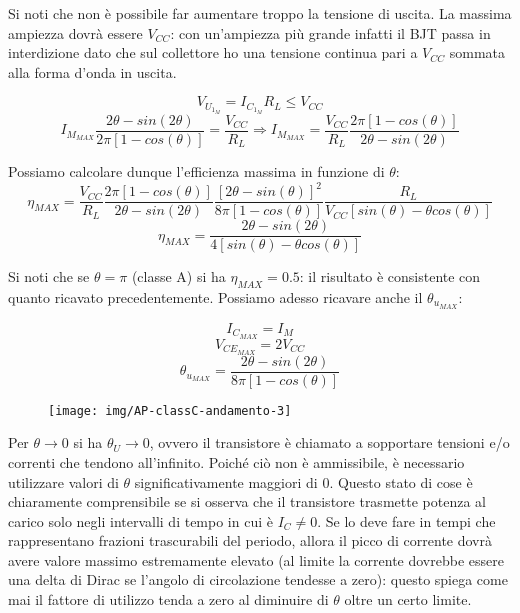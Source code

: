 Si noti che non è possibile far aumentare troppo la tensione di uscita. La massima ampiezza dovrà essere $V_{CC}$: con un'ampiezza più grande infatti il BJT passa in interdizione dato che sul collettore ho una tensione continua pari a $V_{CC}$ sommata alla forma d'onda in uscita.

\[ V_{U_{1_M}} =  I_{C_{1_M}} R_L \le V_{CC}\]
\[I_{M_{MAX}} \frac{2\theta-sin(2\theta)}{2\pi \left[1-cos(\theta)\right]} = \frac{V_{CC}}{R_L} \Rightarrow 
I_{M_{MAX}} = \frac{V_{CC}}{R_L} \frac{2\pi \left[1-cos(\theta)\right]}{2\theta-sin(2\theta)}
\]

Possiamo calcolare dunque l'efficienza massima in funzione di $\theta$:
\[\eta_{MAX} =  \frac{V_{CC}}{R_L} \frac{2\pi \left[1-cos(\theta)\right]}{2\theta-sin(2\theta)} \frac{\left[2\theta - sin(\theta)\right]^2}{8\pi \left[1-cos(\theta)\right]} \frac{R_L}{V_{CC}\left[sin(\theta)-\theta cos(\theta)\right]}\]
\[\eta_{MAX} = \frac{2\theta - sin(2\theta)}{4\left[ sin(\theta) - \theta cos(\theta)\right]}\]

Si noti che se $\theta = \pi$ (classe A) si ha $\eta_{MAX} = 0.5$: il risultato è consistente con quanto ricavato precedentemente. Possiamo adesso ricavare anche il $\theta_{u_{MAX}}$:

\[I_{C_{MAX}} = I_M\]
\[V_{CE_{MAX}} = 2V_{CC} \]
\[\theta_{u_{MAX}} = \frac{2\theta - sin(2\theta)}{8\pi\left[  1-cos(\theta)\right]}\]





\begin{figure}[tbh]
\centering
\texttt{[image: img/AP-classC-andamento-3]}
\caption{}
\label{fig:ap-classc-andamento-3}
\end{figure}


Per $\theta \rightarrow 0$ si ha $\theta_U \rightarrow 0$, ovvero il transistore è chiamato a sopportare tensioni e/o correnti che tendono all'infinito. Poiché
ciò non è ammissibile, è necessario utilizzare valori di $\theta$ significativamente maggiori di 0. Questo
stato di cose è chiaramente comprensibile se si osserva che il transistore trasmette potenza al carico
solo negli intervalli di tempo in cui è $I_C \neq 0$. Se lo deve fare in tempi che rappresentano frazioni
trascurabili del periodo, allora il picco di corrente dovrà avere valore massimo estremamente
elevato (al limite la corrente dovrebbe essere una delta di Dirac se l'angolo di circolazione tendesse
a zero): questo spiega come mai il fattore di utilizzo tenda a zero al diminuire di $\theta$ oltre un certo
limite.

